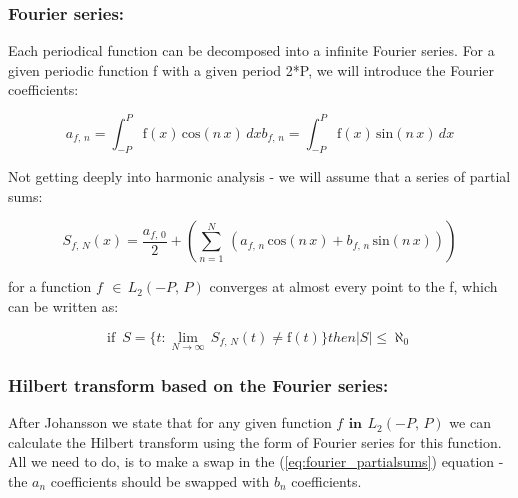 \documentclass[12pt,twoside,a4paper]{article}
\numberwithin{equation}{subsection}
\numberwithin{figure}{subsection}
\begin{document}
\subsubsection*{Fourier series:} 

Each periodical function can be decomposed into a infinite Fourier series. For a given periodic function f with a given period 2*P,
we will introduce the Fourier coefficients:

\begin{subequations} \label{eq:fourier_coeffs}
  \begin{equation}   \label{eq:fcoeffs_an}
    {a_{f, \,n}}=\int_{ - P}^{P}\mathrm{f}(x)\,\mathrm{cos}(n\,x)\, dx
  \end{equation}
  \begin{equation}   \label{eq:fcoeffs_bn}
    {b_{f, \,n}}=\int_{ - P}^{P}\mathrm{f}(x)\,\mathrm{sin}(n\,x)\, dx
  \end{equation}
\end{subequations}

Not getting deeply into harmonic analysis - we will assume that a series of partial sums:

\begin{equation} \label{eq:fourier_partialsums}
  {S_{f, \,N}}(x)=\frac {{a_{f, \,0}}}{2} + (\sum_{n=1}^{N}\,({a
_{f, \,n}}\,\mathrm{cos}(n\,x) + {b_{f, \,n}}\,\mathrm{sin}(n\,x)
))
\end{equation}

for a function $f\,\ \in \,{L_{2}}( - P, \,P)$ converges at almost every point to the f, which can be written as:

\begin{equation} \label{eq:fourier_canbewritten}
  \mbox{if }\,S = \{t : \lim_{N\rightarrow \infty }\,{S_{f, \,N}}(t) \neq \mathrm{f}(t) \} then |S| \leq {\aleph_{0}}
\end{equation}

\subsubsection*{Hilbert transform based on the Fourier series:}

After Johansson \cite{johansson_hilbert} we state that for any given function $f\,\ \textbf{in}\ \,{L_{2}}( - P, \,P)$ we can
calculate the Hilbert transform using the form of Fourier series for this function. All we need to do, is to make a swap in the
(\ref{eq:fourier_partialsums}) equation - the ${a_{n}}$ coefficients should be swapped with ${b_{n}}$ coefficients.
\end{document}
